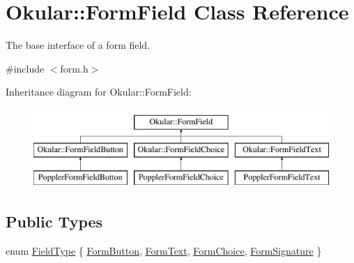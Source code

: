 \hypertarget{classOkular_1_1FormField}{\section{Okular\+:\+:Form\+Field Class Reference}
\label{classOkular_1_1FormField}
}


The base interface of a form field.  




{\ttfamily \#include $<$form.\+h$>$}

Inheritance diagram for Okular\+:\+:Form\+Field\+:\begin{figure}[H]
\begin{center}
\leavevmode
\includegraphics[height=3.000000cm]{classOkular_1_1FormField}
\end{center}
\end{figure}
\subsection*{Public Types}
\begin{DoxyCompactItemize}
\item 
enum \hyperlink{classOkular_1_1FormField_a46e9c2bd0942dfe55408c8c1aa5363cf}{Field\+Type} \{ \hyperlink{classOkular_1_1FormField_a46e9c2bd0942dfe55408c8c1aa5363cfa8c2253f3712ab5b8f221ac945be8a3a2}{Form\+Button}, 
\hyperlink{classOkular_1_1FormField_a46e9c2bd0942dfe55408c8c1aa5363cfa46c90a3f76b54ce41f6b07b78a3bd394}{Form\+Text}, 
\hyperlink{classOkular_1_1FormField_a46e9c2bd0942dfe55408c8c1aa5363cfa77c671816ffafa08e36800e93fceb51d}{Form\+Choice}, 
\hyperlink{classOkular_1_1FormField_a46e9c2bd0942dfe55408c8c1aa5363cfaf961396de9c7fc19fcd4dda366a6c707}{Form\+Signature}
 \}
\end{DoxyCompactItemize}
